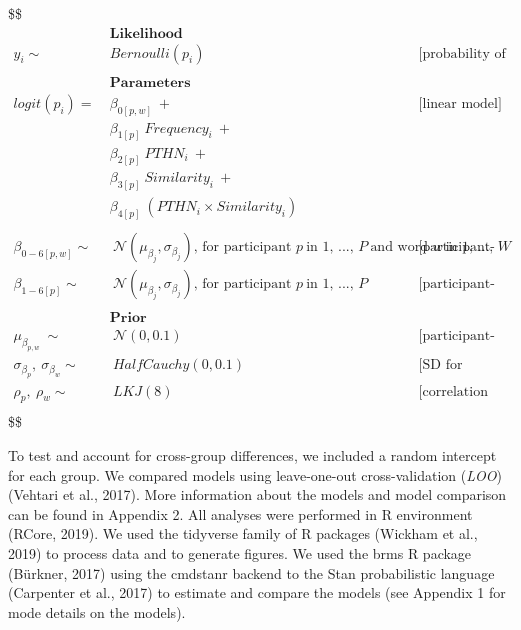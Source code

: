 \documentclass[
  english,
  man,floatsintext]{apa7}
\begin{document}
\$\$\begin{align}

&\textbf{Likelihood}  \\
y_{i} \sim& Bernoulli(p_{i}) && \text{[probability of correct translation]} \\ \\

&\textbf{Parameters}  \\

logit(p_{i}) = ~ &  \beta_{0[p,w]} ~ +  && \text{[linear model]}\\
& \beta_{1[p]} ~ Frequency_{i} ~ + \\
& \beta_{2[p]} ~ PTHN_i ~ + \\
& \beta_{3[p]} ~ Similarity_i ~ + \\
& \beta_{4[p]} ~ (PTHN_i \times Similarity_i) \\ \\

\beta_{0-6[p,w]} \sim& ~  \mathcal{N}(\mu_{\beta_{j}}, \sigma_{\beta_{j}}) \text{, for participant } p ~\text{in 1, ..., } P ~\text{and  word } w ~\text{in 1, ..., } W && \text{[participant- and word-level intercepts]} \\
\beta_{1-6[p]} \sim& ~  \mathcal{N}(\mu_{\beta_{j}}, \sigma_{\beta_{j}}) \text{, for participant } p ~\text{in 1, ..., } P
&& \text{[participant-level coefficients]} \\ \\

&\textbf{Prior}  \\

\mu_{\beta_{p,w}} ~ \sim& ~ \mathcal{N}(0, 0.1) && \text{[participant-level coefficients]} \\
\sigma_{\beta_{p}}, ~ \sigma_{\beta_{w}} \sim& ~ HalfCauchy(0, 0.1) && \text{[SD for population and participant]} \\
\rho_{p}, ~ \rho_{w} \sim& ~LKJ(8) && \text{[correlation between participant-level coefficients]} \\


\end{align}\$\$

To test and account for cross-group differences, we included a random intercept for each group. We compared models using leave-one-out cross-validation (\emph{LOO}) (Vehtari et al., 2017). More information about the models and model comparison can be found in Appendix 2. All analyses were performed in R environment (RCore, 2019). We used the tidyverse family of R packages (Wickham et al., 2019) to process data and to generate figures. We used the brms R package (Bürkner, 2017) using the cmdstanr backend to the Stan probabilistic language (Carpenter et al., 2017) to estimate and compare the models (see Appendix 1 for mode details on the models).
\end{document}
